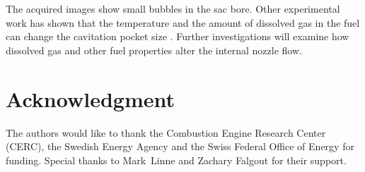 \documentclass[letterpaper,twocolumn,10pt]{ilass}
\begin{document}
The acquired images show small bubbles in the sac bore. Other experimental work has shown
that the temperature and the amount of dissolved gas in the fuel can change the cavitation
pocket size \cite{Watanabe2014}.
Further investigations will examine how dissolved gas and other fuel properties alter the
internal nozzle flow.

\section*{Acknowledgment}
The authors would like to thank the Combustion Engine Research Center (CERC),
the Swedish Energy Agency and the Swiss Federal Office of Energy for funding.
Special thanks to Mark~Linne and Zachary Falgout for their support.




\end{document}
